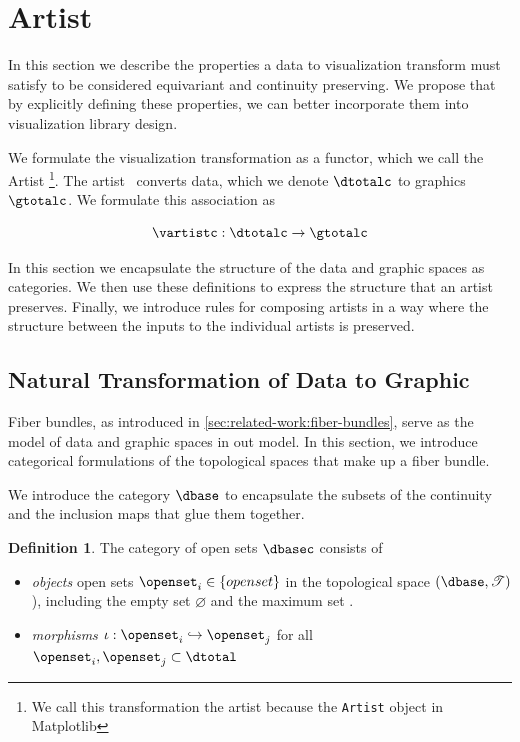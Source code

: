 \documentclass[10pt,journal,compsoc]{IEEEtran}
\theoremstyle{definition}
\newtheorem{definition}{Definition}[section]
\theoremstyle{remark}
\begin{document}
\section{Artist} 
In this section we describe the properties a data to visualization transform must satisfy to be considered equivariant and continuity preserving. We propose that by explicitly defining these properties, we can better incorporate them into visualization library design. 

We formulate the visualization transformation as a functor, which we call the \textcolor{artist}{Artist} \vartist \footnote{We call this transformation the artist because the \texttt{Artist} object in Matplotlib\cite{hunterMatplotlib2DGraphics2007}}. The artist \vartist\ converts \textcolor{total}{data}, which we denote $\mathcal{\dtotalc}$ to \textcolor{total}{graphics} $\mathcal{\gtotalc}$. We formulate this association as 

\begin{equation}
  \label{eq:artist:artist}
  \vartistc: \mathcal{\dtotalc} \rightarrow \mathcal{\gtotalc}
\end{equation}

In this section we encapsulate the structure of the data and graphic spaces as categories. We then use these definitions to express the structure that an artist preserves. Finally, we introduce rules for composing artists in a way where the structure between the inputs to the individual artists is preserved. 


\subsection{Natural Transformation of Data to Graphic}
\label{sec:artist:category}

Fiber bundles, as introduced in \autoref{sec:related-work:fiber-bundles}, serve as the model of data and graphic spaces in out model. In this section, we introduce categorical formulations of the topological spaces that make up a fiber bundle. 

We introduce the category $\mathcal{\dbase}$ to encapsulate the subsets of the continuity and the inclusion maps that glue them together. 

\begin{definition} \label{def:category:K} The category of open sets $\mathcal{\dbasec}$ consists of
  \begin{itemize}
    \item \textit{objects} open sets $\openset_{i} \in \{openset\}$ in the topological space $(\dbase, \mathscr{T})$), including the empty set $\varnothing$ and the maximum set \dbase. 
    \item \textit{morphisms} $\iota: \openset_{i} \hookrightarrow \openset_{j}$ for all  $\openset_i, \openset_j \subset \dtotal$
  \end{itemize} 
\end{definition}
\end{document}
